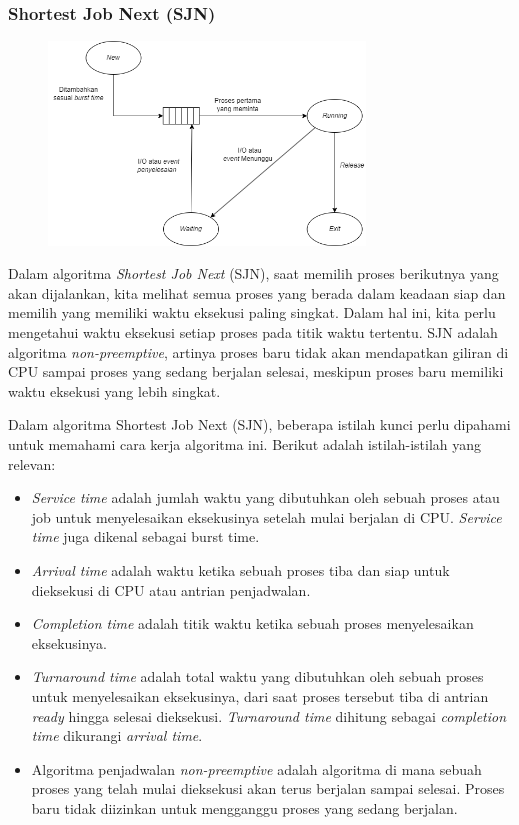 \documentclass[12pt]{article}
\begin{document}
    \subsubsection{Shortest Job Next (SJN)}
    \begin{figure}[h]
    \centering
    \includegraphics[width=0.75\textwidth]{assets/SJN 2.1.png}
    \label{fig:diagram}
    \end{figure}
     \hspace{1cm} Dalam algoritma \textit{Shortest Job Next} (SJN), saat memilih proses berikutnya yang akan dijalankan, kita melihat semua proses yang berada dalam keadaan siap dan memilih yang memiliki waktu eksekusi paling singkat. Dalam hal ini, kita perlu mengetahui waktu eksekusi setiap proses pada titik waktu tertentu. SJN adalah algoritma \textit{non-preemptive}, artinya proses baru tidak akan mendapatkan giliran di CPU sampai proses yang sedang berjalan selesai, meskipun proses baru memiliki waktu eksekusi yang lebih singkat.

    \hspace{1cm} Dalam algoritma Shortest Job Next (SJN), beberapa istilah kunci perlu dipahami untuk memahami cara kerja algoritma ini. Berikut adalah istilah-istilah yang relevan: 
    
    \begin{itemize}
        \item \textit{Service time} adalah jumlah waktu yang dibutuhkan oleh sebuah proses atau job untuk menyelesaikan eksekusinya setelah mulai berjalan di CPU. \textit{Service time} juga dikenal sebagai burst time.
        \item \textit{Arrival time} adalah waktu ketika sebuah proses tiba dan siap untuk dieksekusi di CPU atau antrian penjadwalan.
        \item \textit{Completion time} adalah titik waktu ketika sebuah proses menyelesaikan eksekusinya.
        \item \textit{Turnaround time} adalah total waktu yang dibutuhkan oleh sebuah proses untuk menyelesaikan eksekusinya, dari saat proses tersebut tiba di antrian \textit{ready} hingga selesai dieksekusi. \textit{Turnaround time} dihitung sebagai \textit{completion time} dikurangi \textit{arrival time}.
        \item Algoritma penjadwalan \textit{non-preemptive} adalah algoritma di mana sebuah proses yang telah mulai dieksekusi akan terus berjalan sampai selesai. Proses baru tidak diizinkan untuk mengganggu proses yang sedang berjalan.
    \end{itemize}
    
\end{document}
